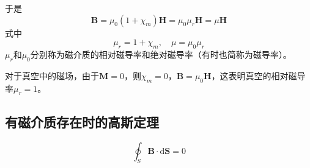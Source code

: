 \documentclass[12pt]{article}
\newcommand{\rmd}{\mathrm{d}}
\begin{document}
于是
\begin{equation}
    \boldsymbol{B} = \mu_0 (1 + \chi_m)\boldsymbol{H} = \mu_0 \mu_r \boldsymbol{H}= \mu \boldsymbol{H}
\end{equation}
式中
\begin{equation}
    \mu_r = 1 + \chi_m, \quad \mu = \mu_0\mu_r
\end{equation}
\(\mu_r\)和\(\mu_0\)分别称为磁介质的相对磁导率和绝对磁导率（有时也简称为磁导率）。

对于真空中的磁场，由于\(\boldsymbol{M} = 0\)，则\(\chi_m = 0\)，\(\boldsymbol{B} = \mu_0 \boldsymbol{H}\)，这表明真空的相对磁导率\(\mu_r = 1\)。

\subsection{有磁介质存在时的高斯定理}

\begin{equation}
    \oint_S \boldsymbol{B} \cdot \rmd \boldsymbol{S} = 0
\end{equation}
\end{document}
